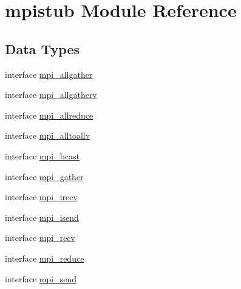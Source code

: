 \hypertarget{namespacempistub}{}\section{mpistub Module Reference}
\label{namespacempistub}
\subsection*{Data Types}
\begin{DoxyCompactItemize}
\item 
interface \mbox{\hyperlink{interfacempistub_1_1mpi__allgather}{mpi\+\_\+allgather}}
\item 
interface \mbox{\hyperlink{interfacempistub_1_1mpi__allgatherv}{mpi\+\_\+allgatherv}}
\item 
interface \mbox{\hyperlink{interfacempistub_1_1mpi__allreduce}{mpi\+\_\+allreduce}}
\item 
interface \mbox{\hyperlink{interfacempistub_1_1mpi__alltoallv}{mpi\+\_\+alltoallv}}
\item 
interface \mbox{\hyperlink{interfacempistub_1_1mpi__bcast}{mpi\+\_\+bcast}}
\item 
interface \mbox{\hyperlink{interfacempistub_1_1mpi__gather}{mpi\+\_\+gather}}
\item 
interface \mbox{\hyperlink{interfacempistub_1_1mpi__irecv}{mpi\+\_\+irecv}}
\item 
interface \mbox{\hyperlink{interfacempistub_1_1mpi__isend}{mpi\+\_\+isend}}
\item 
interface \mbox{\hyperlink{interfacempistub_1_1mpi__recv}{mpi\+\_\+recv}}
\item 
interface \mbox{\hyperlink{interfacempistub_1_1mpi__reduce}{mpi\+\_\+reduce}}
\item 
interface \mbox{\hyperlink{interfacempistub_1_1mpi__send}{mpi\+\_\+send}}
\end{DoxyCompactItemize}
